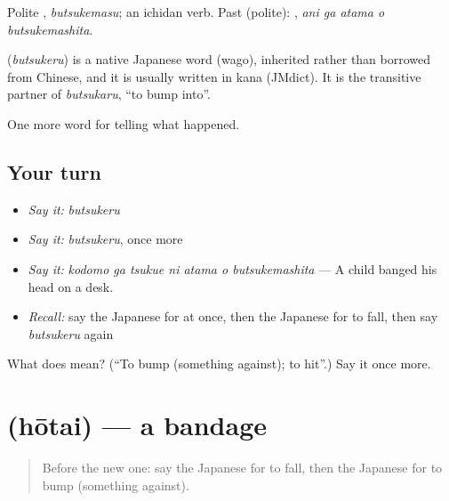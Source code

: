 Polite \textbf{}, \emph{butsukemasu}; an ichidan verb. Past (polite): \textbf{  }, \emph{ani ga atama o butsukemashita}.

\begin{cousinweb}
\textbf{} (\emph{butsukeru}) is a native Japanese word (wago), inherited rather than borrowed from Chinese, and it is usually written in kana (JMdict). It is the transitive partner of \emph{butsukaru}, \textquotedblleft{}to bump into\textquotedblright{}.
\end{cousinweb}

\begin{grammarlens}[title={What you've built}]
One more word for telling what happened.
\end{grammarlens}

\subsection*{Your turn}
\begin{itemize}
\raggedright
  \item \emph{Say it:} \emph{butsukeru}
  \item \emph{Say it:} \emph{butsukeru}, once more
  \item \emph{Say it:} \emph{kodomo ga tsukue ni atama o butsukemashita} — A child banged his head on a desk.
  \item \emph{Recall:} say the Japanese for at once, then the Japanese for to fall, then say \emph{butsukeru} again
\end{itemize}

\begin{tcolorbox}[breakable,colback=teal!4,colframe=teal!35!black,title={Before you move on}]
What does  mean? (\textquotedblleft{}To bump (something against); to hit\textquotedblright{}.) Say it once more.
\end{tcolorbox}
\section[\texorpdfstring{\ja{ほうたい} (hōtai)}{ほうたい (hōtai)}]{ (hōtai) — a bandage}

\label{lesson:JA-C264-houtai}



\begin{quote}
Before the new one: say the Japanese for to fall, then the Japanese for to bump (something against).
\end{quote}

